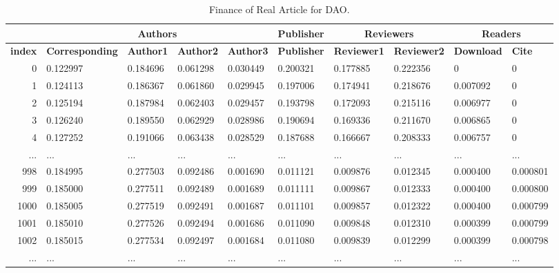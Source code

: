 \documentclass[lettersize,journal]{IEEEtran}
\begin{document}
\begin{table}[t!]
  \begin{center}
    \caption{Finance of Real Article for DAO.}
    \label{tab:realpaper}
    \begin{tabular}{r|l|l|l|l|l|l|l|l|l} %
      & \multicolumn{4}{c|}{\textbf{Authors}} & \textbf{Publisher} & \multicolumn{2}{c|}{\textbf{Reviewers}} & \multicolumn{2}{c}{\textbf{Readers}}\\
      \hline
      \textbf{index} & \textbf{Corresponding} & \textbf{Author1} & \textbf{Author2} & \textbf{Author3} & \textbf{Publisher} & \textbf{Reviewer1} & \textbf{Reviewer2} & \textbf{Download} & \textbf{Cite}\\
      \hline
      0 & 0.122997 & 0.184696 & 0.061298 & 0.030449 & 0.200321 & 0.177885 & 0.222356 & 0 & 0 \\
      1 & 0.124113 & 0.186367 & 0.061860 & 0.029945 & 0.197006 & 0.174941 & 0.218676 & 0.007092 & 0 \\
      2 & 0.125194 & 0.187984 & 0.062403 & 0.029457 & 0.193798 & 0.172093 & 0.215116 & 0.006977 & 0 \\
      3 & 0.126240 & 0.189550 & 0.062929 & 0.028986 & 0.190694 & 0.169336 & 0.211670 & 0.006865 & 0 \\
      4 & 0.127252 & 0.191066 & 0.063438 & 0.028529 & 0.187688 & 0.166667 & 0.208333 & 0.006757 & 0 \\
      ... & ... & ... & ... & ... & ... & ... & ... & ... & ... \\

      998 & 0.184995 & 0.277503 & 0.092486 & 0.001690 & 0.011121 & 0.009876 & 0.012345 & 0.000400 & 0.000801 \\
      999 & 0.185000 & 0.277511 & 0.092489 & 0.001689 & 0.011111 & 0.009867 & 0.012333 & 0.000400 & 0.000800 \\
      1000 & 0.185005 & 0.277519 & 0.092491 & 0.001687 & 0.011101 & 0.009857 & 0.012322 & 0.000400 & 0.000799 \\
      1001 & 0.185010 & 0.277526 & 0.092494 & 0.001686 & 0.011090 & 0.009848 & 0.012310 & 0.000399 & 0.000799 \\
      1002 & 0.185015 & 0.277534 & 0.092497 & 0.001684 & 0.011080 & 0.009839 & 0.012299 & 0.000399 & 0.000798 \\
      
      ... & ... & ... & ... & ... & ... & ... & ... & ... & ... \\


\end{tabular}
\end{center}
\end{table}
\end{document}
